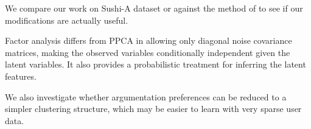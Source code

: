 We compare our work on Sushi-A dataset or against the method of \cite{khan2014scalable} to see if 
our modifications are actually useful. 

Factor analysis differs from PPCA in allowing only diagonal noise covariance matrices, making 
the observed variables conditionally independent given the latent variables. It also provides
a probabilistic treatment for inferring the latent features. %

We also investigate whether argumentation preferences can be reduced to a simpler
clustering structure, which may be easier to learn with very sparse user data.

